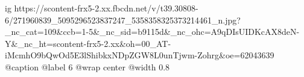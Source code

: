  
 
 
 
 

\ifcmt
  ig https://scontent-frx5-2.xx.fbcdn.net/v/t39.30808-6/271960839_5095296523837247_5358358325373214461_n.jpg?_nc_cat=109&ccb=1-5&_nc_sid=b9115d&_nc_ohc=A9qDIsUIDKcAX8deN-Y&_nc_ht=scontent-frx5-2.xx&oh=00_AT-iMcmhO9bQwOd5E3lShibkxNDpZGW8L0unTjwm-Zohrg&oe=62043639
  @caption @label 6
  @wrap center
  @width 0.8
\fi
